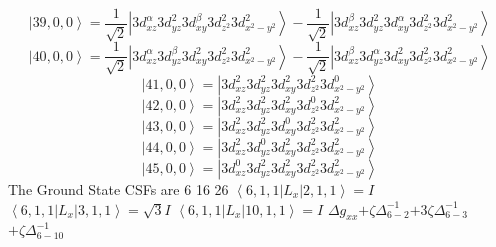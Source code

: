 \documentclass[11pt]{article}
\begin{document}
\begin{equation*}
\left|39,0,0\right>=\frac{1}{\sqrt{2}}\left|3d_{xz}^{\alpha}3d_{yz}^{2}3d_{xy}^{\beta}3d_{z^2}^{2}3d_{x^2-y^2}^{2}\right>-\frac{1}{\sqrt{2}}\left|3d_{xz}^{\beta}3d_{yz}^{2}3d_{xy}^{\alpha}3d_{z^2}^{2}3d_{x^2-y^2}^{2}\right>\end{equation*}
\begin{equation*}
\left|40,0,0\right>=\frac{1}{\sqrt{2}}\left|3d_{xz}^{\alpha}3d_{yz}^{\beta}3d_{xy}^{2}3d_{z^2}^{2}3d_{x^2-y^2}^{2}\right>-\frac{1}{\sqrt{2}}\left|3d_{xz}^{\beta}3d_{yz}^{\alpha}3d_{xy}^{2}3d_{z^2}^{2}3d_{x^2-y^2}^{2}\right>\end{equation*}
\begin{equation*}
\left|41,0,0\right>=\left|3d_{xz}^{2}3d_{yz}^{2}3d_{xy}^{2}3d_{z^2}^{2}3d_{x^2-y^2}^{0}\right>\end{equation*}
\begin{equation*}
\left|42,0,0\right>=\left|3d_{xz}^{2}3d_{yz}^{2}3d_{xy}^{2}3d_{z^2}^{0}3d_{x^2-y^2}^{2}\right>\end{equation*}
\begin{equation*}
\left|43,0,0\right>=\left|3d_{xz}^{2}3d_{yz}^{2}3d_{xy}^{0}3d_{z^2}^{2}3d_{x^2-y^2}^{2}\right>\end{equation*}
\begin{equation*}
\left|44,0,0\right>=\left|3d_{xz}^{2}3d_{yz}^{0}3d_{xy}^{2}3d_{z^2}^{2}3d_{x^2-y^2}^{2}\right>\end{equation*}
\begin{equation*}
\left|45,0,0\right>=\left|3d_{xz}^{0}3d_{yz}^{2}3d_{xy}^{2}3d_{z^2}^{2}3d_{x^2-y^2}^{2}\right>\end{equation*}
The Ground State CSFs are 6 16 26 \newline\newline\newline
$\left\langle6,1,1\left|L_{x}\right|2,1,1\right\rangle=I$\newline
$\left\langle6,1,1\left|L_{x}\right|3,1,1\right\rangle=\sqrt{3}I$\newline
$\left\langle6,1,1\left|L_{x}\right|10,1,1\right\rangle=I$\newline
\newline$\Delta g_{xx}$\newline\newline$+\zeta \Delta_{6-2}^{-1}$\newline$+3\zeta \Delta_{6-3}^{-1}$\newline$+\zeta \Delta_{6-10}^{-1}$\newline\newline
\end{document}
